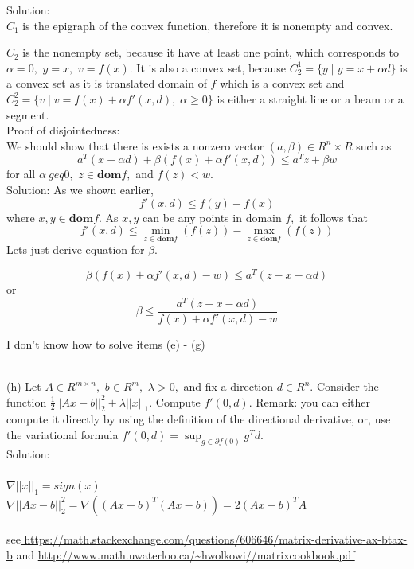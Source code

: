 \documentclass{article}
\begin{document}
Solution: \\

$C_1$ is the epigraph of the convex function, therefore 
it is nonempty and convex.

$C_2$ is the nonempty set, because it have at least one point, which corresponds to $\alpha = 0,$ $y = x,$ $v = f(x).$ It is also a convex set, because 
$C^1_2 = \{y\;| \;y = x + \alpha d\}$ is a convex set as it is translated domain of $f$ which is a convex set
and $C^2_2 = \{v\;| \; 
v = f(x) + \alpha f'(x, d), \; \alpha \geq 0 \}$ is either 
a straight line or a beam or a segment. \\

Proof of disjointedness: \\
We should show that there is exists a nonzero vector 
$(a, \beta) \in R^n \times R$ such as
$$
a^T(x + \alpha d) + \beta (f(x) + \alpha f'(x, d)) \leq
a^T z + \beta w
$$
for all $\alpha \ geq 0, $ $z \in \mathbf{dom} f,$ 
and $f(z) < w.$
\\
Solution:
As we shown earlier, 
$$
f'(x, d) \leq f(y) - f(x)
$$
where $x, y \in \mathbf{dom} f.$ As $x, y$ can be any points in domain $f,$ it follows that\\
$$
f'(x, d) \leq \min_{z \in \mathbf{dom} f }(f(z)) - 
\max_{z \in \mathbf{dom} f}(f(z))
$$
Lets just derive equation for $\beta.$

$$
\beta (f(x) + \alpha f'(x, d) - w) \leq 
a^T(z - x - \alpha d)
$$
or
$$
\beta \leq \frac{a^T (z - x - \alpha d)}
{f(x) + \alpha f'(x, d) - w}
$$

I don't know how to solve items (e) - (g) \\\

(h) Let $A \in R^{m\times n},$ $b \in R^m,$ $\lambda > 0,$ 
and fix a direction $d \in R^n.$ Consider the function 
$\frac{1}{2} ||Ax - b||^2_2 + \lambda ||x||_1.$ Compute 
$f'(0, d).$ Remark: you can either compute it
directly by using the definition of the directional derivative, or, use the variational
formula $f'(0, d) = \sup_{g \in \partial f(0)} g^T d.$
\\

Solution: \\ \\
$
\nabla ||x||_1 = sign(x)
$\\

$\nabla ||Ax - b||^2_2 = \nabla((Ax - b)^T (Ax - b)) = 2(Ax - b)^T A
$\\ \\
see\url{ https://math.stackexchange.com/questions/606646/matrix-derivative-ax-btax-b}
and 
\url{
http://www.math.uwaterloo.ca/~hwolkowi//matrixcookbook.pdf
}
\end{document}
